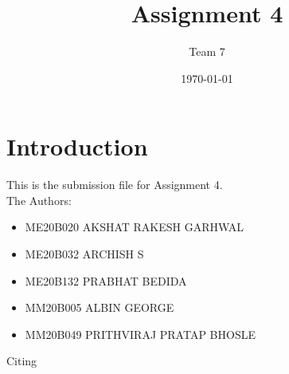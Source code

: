\documentclass[12pt,a4paper]{article}
\begin{document}
\title{Assignment 4}
\author{Team 7}
\date{\today}
\maketitle

\tableofcontents
\listoffigures	
\section{Introduction}
This is the submission file for Assignment 4. \\
The Authors:
\begin{itemize}
	\item ME20B020 AKSHAT RAKESH GARHWAL
	\item ME20B032 ARCHISH S
	\item ME20B132 PRABHAT BEDIDA
	\item MM20B005 ALBIN GEORGE
	\item MM20B049 PRITHVIRAJ PRATAP BHOSLE
\end{itemize}



Citing ~\cite{POMDP}


 
\end{document}
